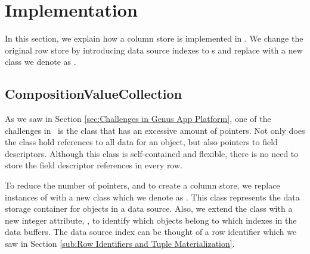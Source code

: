 \section{Implementation}
\label{sec:Implementation}
In this section, we explain how a column store is implemented in \gap. We change the original row store by introducing data source indexes to s and replace  with a new class we denote as .


\subsection{CompositionValueCollection}
\label{sub:CompositionValueCollection}
As we saw in Section \ref{sec:Challenges in Genus App Platform}, one of the challenges in \gap~is the  class that has an excessive amount of pointers. Not only does the class hold references to all data for an object, but also pointers to field descriptors. Although this class is self-contained and flexible, there is no need to store the field descriptor references in every row.


To reduce the number of pointers, and to create a column store, we replace instances of  with a new class which we denote as . This class represents the data storage container for objects in a data source. Also, we extend the  class with a new integer attribute, , to identify which objects belong to which indexes in the data buffers. The data source index can be thought of a row identifier which we saw in Section \ref{sub:Row Identifiers and Tuple Materialization}.

